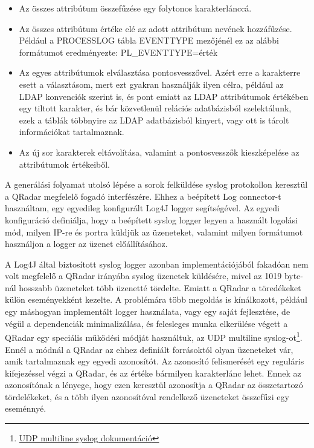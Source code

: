 \begin{itemize}
	\item Az összes attribútum összefűzése egy folytonos karakterlánccá.
	
	\item Az összes attribútum értéke elé az adott attribútum nevének hozzáfűzése. Például a PROCESSLOG tábla EVENTTYPE mezőjénél ez az alábbi formátumot eredményezte: PL\_EVENTTYPE={érték}
	
	\item Az egyes attribútumok elválasztása pontosvesszővel. Azért erre a karakterre esett a választásom, mert ezt gyakran használják ilyen célra, például az LDAP konvenciók szerint is, és pont emiatt az LDAP attribútumok értékében egy tiltott karakter, és bár közvetlenül relációs adatbázisból szelektálunk, ezek a táblák többnyire az LDAP adatbázisból kinyert, vagy ott is tárolt információkat tartalmaznak.
	
	\item Az új sor karakterek eltávolítása, valamint a pontosvesszők \todo kieszképelése az attribútumok értékeiből.
\end{itemize} 




A generálási folyamat utolsó lépése a sorok felküldése syslog protokollon keresztül a QRadar megfelelő fogadó interfészére. Ehhez a beépített Log connector-t használtam, egy egyedileg konfigurált Log4J logger segítségével. Az egyedi konfiguráció definiálja, hogy a beépített syslog logger legyen a használt logolási mód, milyen IP-re és portra küldjük az üzeneteket, valamint milyen formátumot használjon a logger az üzenet előállításához.

A Log4J által biztosított syslog logger azonban implementációjából fakadóan nem volt megfelelő a QRadar irányába syslog üzenetek küldésére, mivel az 1019 byte-nál hosszabb üzeneteket több üzenetté tördelte. Emiatt a QRadar a töredékeket külön eseményekként kezelte. A problémára több megoldás is kínálkozott, például egy máshogyan implementált logger használata, vagy egy saját fejlesztése, de végül a dependenciák minimalizálása, és felesleges munka elkerülése végett a QRadar egy speciális működési módját használtuk, az UDP multiline syslog-ot\footnote{ \href{https://www.ibm.com/support/knowledgecenter/SS42VS_7.2.2/com.ibm.qradar.doc_7.2.2/t_logsource_UDPmultiprotocol.html}{UDP multiline syslog dokumentáció}}. Ennél a módnál a QRadar az ehhez definiált forrásoktól olyan üzeneteket vár, amik tartalmaznak egy egyedi azonosítót. Az azonosító felismerését egy reguláris kifejezéssel végzi a QRadar, és az értéke bármilyen karakterlánc lehet. Ennek az azonosítónak a lényege, hogy ezen keresztül azonosítja a QRadar az összetartozó tördelékeket, és a több ilyen azonosítóval rendelkező üzeneteket összefűzi egy eseménnyé.

